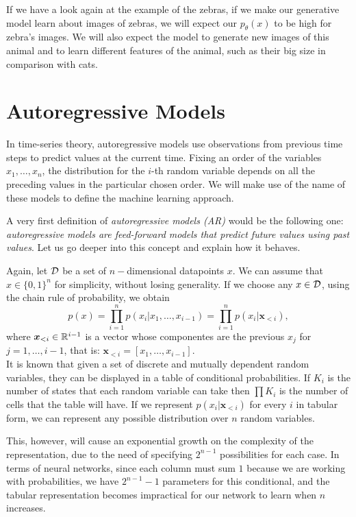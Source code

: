 If we have a look again at the example of the zebras, if we make our generative model learn about images of zebras, we will expect our $p_\theta(x)$ to be high for zebra's images. We will also expect the model
to generate new images of this animal and to learn different features of the animal, such as their big size in comparison with cats.

\section{Autoregressive Models}

In time-series theory, autoregressive models use observations from previous time steps to predict values at the current time. 
Fixing an order of the variables $x_1,\dots,x_n$, the distribution for the $i$-th random variable depends on all the preceding values in the particular chosen order. We will make use of the name of these models to 
define the machine learning approach.

A very first definition of \emph{autoregressive models (AR)} would be the following one: \emph{autoregressive models are feed-forward models that predict future values using past values}. Let us go deeper into this 
concept and explain how it behaves.

Again, let $\mathcal{D}$ be a set of $n-$dimensional datapoints $x$. We can assume that $x \in \{0,1\}^n$ for simplicity, without losing generality. If we choose any $x\in \mathcal{D}$, using the chain rule of probability, we obtain
\[
p(x) = \prod_{i=1} ^n p(x_i | x_1,\dots,x_{i-1}) = \prod_{i = 1}^n p(x_i|\bm{x}_{<i}),
\]
where $\bm{x}_{<i} \in \mathbb{R}^{i-1}$ is a vector whose componentes are the previous $x_j$ for $j = 1,\dots, i-1$, that is: $\bm{x}_{<i}= [x_1,\dots, x_{i-1}]$. \\
It is known that given a set of discrete and mutually dependent random variables, they can be displayed in a table of conditional probabilities. If $K_i$ is the number of states that each random variable can take
then $\prod K_i$ is the number of cells that the table will have. If we represent $p(x_i|\bm{x}_{<i})$ for every $i$ in tabular form, we can represent
any possible distribution over $n$ random variables. 

This, however, will cause an exponential growth on the complexity of the representation, due to the need of specifying $2^{n-1}$ possibilities 
for each case. In terms of neural networks, since each column must sum $1$ because we are working with probabilities, we have $2^{n-1}-1$ parameters for this conditional, and the tabular representation
becomes impractical for our network to learn when $n$ increases.

